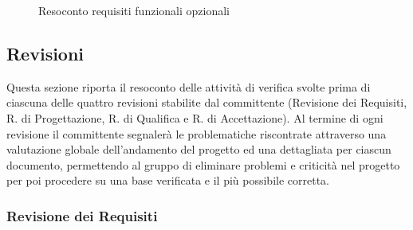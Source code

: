 \begin{itemize}
\begin{figure} [H]
		\caption{Resoconto requisiti funzionali opzionali}
	\end{figure}
\end{itemize}

\newpage



\subsection{Revisioni}
Questa sezione riporta il resoconto delle attività di verifica svolte prima di ciascuna delle quattro revisioni stabilite dal committente (Revisione dei Requisiti, R. di Progettazione, R. di Qualifica e R. di Accettazione).
Al termine di ogni revisione il committente segnalerà le problematiche riscontrate attraverso una valutazione globale dell'andamento del progetto ed una dettagliata per ciascun documento, permettendo al gruppo di eliminare problemi e criticità nel progetto per poi procedere su una base verificata e il più possibile corretta.

\subsubsection{Revisione dei Requisiti}

